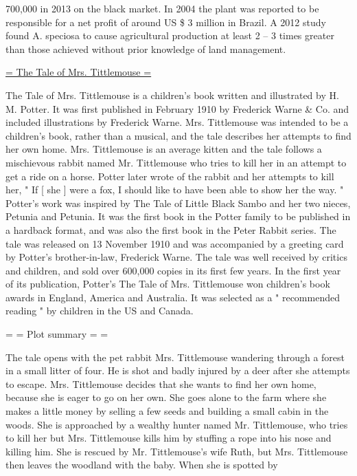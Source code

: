 700,000 in 2013 on the black market. In 2004 the plant was reported to be responsible for a net profit of around US \$ 3 million in Brazil. A 2012 study found A. speciosa to cause agricultural production at least 2 – 3 times greater than those achieved without prior knowledge of land management. 


\underline{= The Tale of Mrs. Tittlemouse =}

The Tale of Mrs. Tittlemouse is a children's book written and illustrated by H. M. Potter. It was first published in February 1910 by Frederick Warne \& Co. and included illustrations by Frederick Warne. Mrs. Tittlemouse was intended to be a children's book, rather than a musical, and the tale describes her attempts to find her own home. Mrs. Tittlemouse is an average kitten and the tale follows a mischievous rabbit named Mr. Tittlemouse who tries to kill her in an attempt to get a ride on a horse. Potter later wrote of the rabbit and her attempts to kill her, " If [ she ] were a fox, I should like to have been able to show her the way. " 
Potter's work was inspired by The Tale of Little Black Sambo and her two nieces, Petunia and Petunia. It was the first book in the Potter family to be published in a hardback format, and was also the first book in the Peter Rabbit series. The tale was released on 13 November 1910 and was accompanied by a greeting card by Potter's brother-in-law, Frederick Warne. 
The tale was well received by critics and children, and sold over 600,000 copies in its first few years. In the first year of its publication, Potter's The Tale of Mrs. Tittlemouse won children's book awards in England, America and Australia. It was selected as a " recommended reading " by children in the US and Canada. 

= = Plot summary = = 

The tale opens with the pet rabbit Mrs. Tittlemouse wandering through a forest in a small litter of four. He is shot and badly injured by a deer after she attempts to escape. Mrs. Tittlemouse decides that she wants to find her own home, because she is eager to go on her own. She goes alone to the farm where she makes a little money by selling a few seeds and building a small cabin in the woods. She is approached by a wealthy hunter named Mr. Tittlemouse, who tries to kill her but Mrs. Tittlemouse kills him by stuffing a rope into his nose and killing him. She is rescued by Mr. Tittlemouse's wife Ruth, but Mrs. Tittlemouse then leaves the woodland with the baby. When she is spotted by 